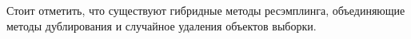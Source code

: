 \documentclass[12pt,a4paper, oneside]{extreport}
\begin{document}
Стоит отметить, что существуют  гибридные методы ресэмплинга, объединяющие методы дублирования и случайное удаления объектов выборки. 




\newpage


\nocite{*}  %

\begingroup
{}

\printbibliography[title = Список литературы]

\endgroup
\end{document}

